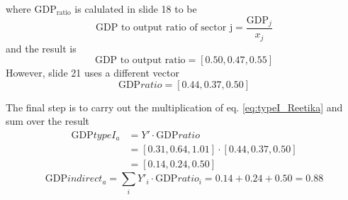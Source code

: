 \documentclass[12pt]{article}
\begin{document}
where $\text{GDP}_{\text{ratio}}$ is calulated in slide 18 to be
\begin{equation}
\text{GDP to output ratio of sector j}  = \frac{\text{GDP}_j}{x_j}
\end{equation}
and the result is
\begin{equation}
\text{GDP to output ratio}  = [0.50, 0.47, 0.55]
\end{equation}
However, slide 21 uses a different vector
\[
\text{GDP}ratio = [0.44, 0.37, 0.50]
\]

The final step is to carry out the multiplication of eq. \ref{eq:typeI_Reetika} and sum over the result
\begin{equation}
\begin{aligned}
\text{GDP} type I_a &= Y' \cdot \text{GDP}ratio \\
                    &= [0.31, 0.64, 1.01] \cdot [0.44, 0.37, 0.50] \\
                    &= [0.14, 0.24, 0.50]
\end{aligned}
\end{equation}
\begin{equation}
\text{GDP} indirect_a = \sum_i{ Y'_i \cdot \text{GDP}ratio_i }= 0.14+0.24+0.50 = 0.88
\end{equation}
 





\end{document}
